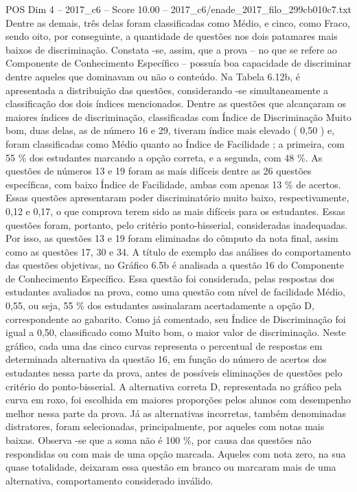 \begin{textsample}{POS Dim 4 – 2017\_c6 – Score 10.00 – 2017\_c6/enade\_2017\_filo\_299cb010c7.txt}
Dentre as demais, três delas foram classificadas como Médio, e cinco, como Fraco, sendo oito, por conseguinte, a quantidade de questões nos dois patamares mais baixos de discriminação.
Constata -se, assim, que a prova – no que se refere ao Componente de Conhecimento Específico – possuía boa capacidade de discriminar dentre aqueles que dominavam ou não o conteúdo.
Na Tabela 6.12b, é apresentada a distribuição das questões, considerando -se simultaneamente a classificação dos dois índices mencionados.
Dentre as questões que alcançaram os maiores índices de discriminação, classificadas com Índice de Discriminação Muito bom, duas delas, as de número 16 e 29, tiveram índice mais elevado ( 0,50 ) e, foram classificadas como Médio quanto ao Índice de Facilidade ; a primeira, com 55 \% dos estudantes marcando a opção correta, e a segunda, com 48 \%.
As questões de números 13 e 19 foram as mais difíceis dentre as 26 questões específicas, com baixo Índice de Facilidade, ambas com apenas 13 \% de acertos.
Essas questões apresentaram poder discriminatório muito baixo, respectivamente, 0,12 e 0,17, o que comprova terem sido as mais difíceis para os estudantes.
Essas questões foram, portanto, pelo critério ponto-bisserial, consideradas inadequadas.
Por isso, as questões 13 e 19 foram eliminadas do cômputo da nota final, assim como as questões 17, 30 e 34.
A título de exemplo das análises do comportamento das questões objetivas, no Gráfico 6.5b é analisada a questão 16 do Componente de Conhecimento Específico.
Essa questão foi considerada, pelas respostas dos estudantes avaliados na prova, como uma questão com nível de facilidade Médio, 0,55, ou seja, 55 \% dos estudantes assinalaram acertadamente a opção D, correspondente ao gabarito.
Como já comentado, seu Índice de Discriminação foi igual a 0,50, classificado como Muito bom, o maior valor de discriminação.
Neste gráfico, cada uma das cinco curvas representa o percentual de respostas em determinada alternativa da questão 16, em função do número de acertos dos estudantes nessa parte da prova, antes de possíveis eliminações de questões pelo critério do ponto-bisserial.
A alternativa correta D, representada no gráfico pela curva em roxo, foi escolhida em maiores proporções pelos alunos com desempenho melhor nessa parte da prova.
Já as alternativas incorretas, também denominadas distratores, foram selecionadas, principalmente, por aqueles com notas mais baixas.
Observa -se que a soma não é 100 \%, por causa das questões não respondidas ou com mais de uma opção marcada.
Aqueles com nota zero, na sua quase totalidade, deixaram essa questão em branco ou marcaram mais de uma alternativa, comportamento considerado inválido.

\end{textsample}
